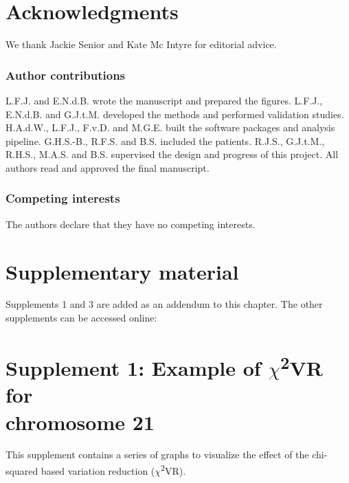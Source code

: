 \section*{Acknowledgments}\label{Acknowledgments} 
We thank Jackie Senior and Kate Mc Intyre for editorial advice.

\subsubsection{Author contributions}
L.F.J. and E.N.d.B. wrote the manuscript and prepared the figures. L.F.J., E.N.d.B. and G.J.t.M. developed the methods and performed validation studies. H.A.d.W., L.F.J., F.v.D. and M.G.E. built the software packages and analysis pipeline. G.H.S.-B., R.F.S. and B.S. included the patients. R.J.S., G.J.t.M., R.H.S., M.A.S. and B.S. supervised the design and progress of this project. All authors read and approved the final manuscript.

\subsubsection{Competing interests}
The authors declare that they have no competing interests.

\section*{Supplementary material}\label{Supplementary material}
Supplements 1 and 3 are added as an addendum to this chapter. 
The other supplements can be accessed online: 


\newpage
{}
\section[$\chi$\textsuperscript{2}VR for chromosome 21]{Supplement 1: Example of $\chi$\textsuperscript{2}VR for \\ chromosome 21}\label{Supplement 1}

This supplement contains a series of graphs to visualize the effect of the chi-squared based variation reduction ($\chi$\textsuperscript{2}VR). 


